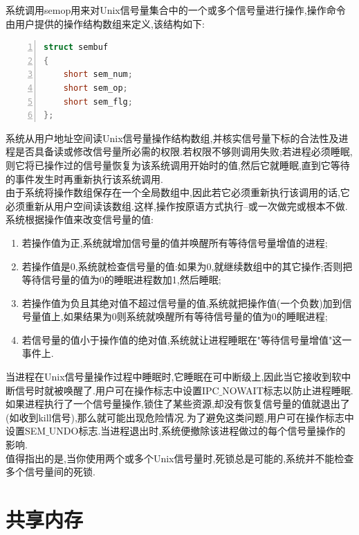 \documentclass[a4paper,12pt,notitlepage]{article}
\begin{document}
	系统调用semop用来对Unix信号量集合中的一个或多个信号量进行操作,操作命令由用户提供的操作结构数组来定义,该结构如下:

\begin{lstlisting}[frame=shadowbox,numbers=left,language=C]
struct sembuf
{   
	short sem_num;   
	short sem_op;    
	short sem_flg;    
};  
\end{lstlisting}

	系统从用户地址空间读Unix信号量操作结构数组,并核实信号量下标的合法性及进程是否具备读或修改信号量所必需的权限.若权限不够则调用失败;若进程必须睡眠,则它将已操作过的信号量恢复为该系统调用开始时的值,然后它就睡眠,直到它等待的事件发生时再重新执行该系统调用.\\

	由于系统将操作数组保存在一个全局数组中,因此若它必须重新执行该调用的话,它必须重新从用户空间读该数组.这样,操作按原语方式执行--或一次做完或根本不做.\\

	系统根据操作值来改变信号量的值:

\begin{enumerate}
	\item 若操作值为正,系统就增加信号量的值并唤醒所有等待信号量增值的进程;
	\item 若操作值是0,系统就检查信号量的值:如果为0,就继续数组中的其它操作;否则把等待信号量的值为0的睡眠进程数加1,然后睡眠;
	\item 若操作值为负且其绝对值不超过信号量的值,系统就把操作值(一个负数)加到信号量值上,如果结果为0则系统就唤醒所有等待信号量的值为0的睡眠进程;
	\item 若信号量的值小于操作值的绝对值,系统就让进程睡眠在"等待信号量增值"这一事件上.
\end{enumerate}

	当进程在Unix信号量操作过程中睡眠时,它睡眠在可中断级上,因此当它接收到软中断信号时就被唤醒了.用户可在操作标志中设置IPC$\_$NOWAIT标志以防止进程睡眠.\\

	如果进程执行了一个信号量操作,锁住了某些资源,却没有恢复信号量的值就退出了(如收到kill信号),那么就可能出现危险情况.为了避免这类问题,用户可在操作标志中设置SEM$\_$UNDO标志.当进程退出时,系统便撤除该进程做过的每个信号量操作的影响.\\

	值得指出的是,当你使用两个或多个Unix信号量时,死锁总是可能的,系统并不能检查多个信号量间的死锁.\\
	
\section{共享内存}
\end{document}
